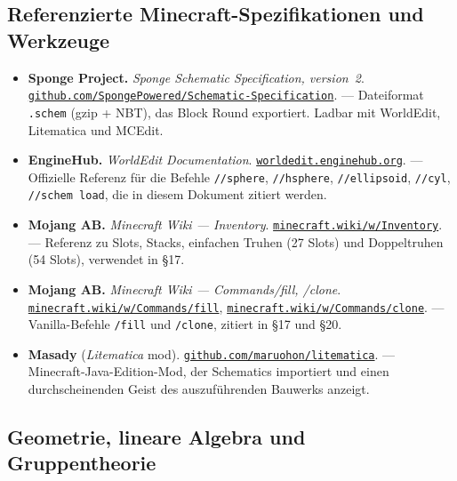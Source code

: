 \documentclass[12pt,a4paper]{scrartcl}
\newcommand{\code}[1]{\texttt{\small #1}}
\newcommand{\cmd}[1]{\textcolor{earth}{\texttt{\small #1}}}
\newcommand{\biblink}[2]{\href{#1}{\nolinkurl{#2}}}
\begin{document}
\subsection*{Referenzierte Minecraft-Spezifikationen und Werkzeuge}

\begin{itemize}[leftmargin=1.4em,itemsep=0.3em,topsep=0.3em]
  \item \textbf{Sponge Project.} \emph{Sponge Schematic Specification, version~2}.
        \biblink{https://github.com/SpongePowered/Schematic-Specification}{github.com/SpongePowered/Schematic-Specification}.
        --- Dateiformat \code{.schem} (gzip + NBT), das Block Round exportiert. Ladbar mit WorldEdit, Litematica und MCEdit.

  \item \textbf{EngineHub.} \emph{WorldEdit Documentation}.
        \biblink{https://worldedit.enginehub.org/}{worldedit.enginehub.org}.
        --- Offizielle Referenz für die Befehle \cmd{//sphere}, \cmd{//hsphere}, \cmd{//ellipsoid}, \cmd{//cyl}, \cmd{//schem load}, die in diesem Dokument zitiert werden.

  \item \textbf{Mojang AB.} \emph{Minecraft Wiki --- Inventory}.
        \biblink{https://minecraft.wiki/w/Inventory}{minecraft.wiki/w/Inventory}.
        --- Referenz zu Slots, Stacks, einfachen Truhen (27 Slots) und Doppeltruhen (54 Slots), verwendet in §17.

  \item \textbf{Mojang AB.} \emph{Minecraft Wiki --- Commands/fill, /clone}.
        \biblink{https://minecraft.wiki/w/Commands/fill}{minecraft.wiki/w/Commands/fill},
        \biblink{https://minecraft.wiki/w/Commands/clone}{minecraft.wiki/w/Commands/clone}.
        --- Vanilla-Befehle \cmd{/fill} und \cmd{/clone}, zitiert in §17 und §20.

  \item \textbf{Masady} (\emph{Litematica} mod).
        \biblink{https://github.com/maruohon/litematica}{github.com/maruohon/litematica}.
        --- Minecraft-Java-Edition-Mod, der Schematics importiert und einen durchscheinenden Geist des auszuführenden Bauwerks anzeigt.
\end{itemize}

\subsection*{Geometrie, lineare Algebra und Gruppentheorie}
\end{document}
